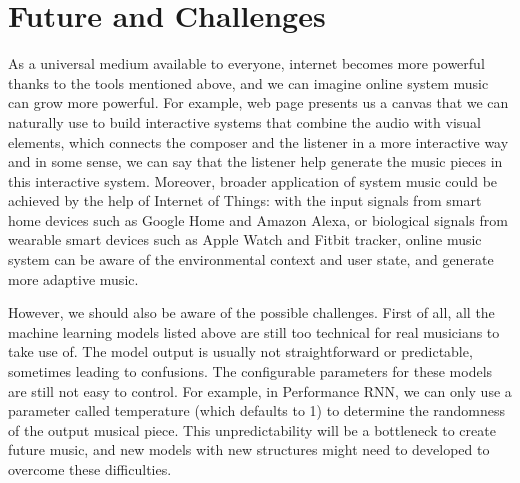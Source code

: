\documentclass[man]{apa6}
\begin{document}
\section{Future and Challenges}
As a universal medium available to everyone, internet becomes more powerful thanks to the tools mentioned above, and we can imagine online system music can grow more powerful. For example, web page presents us a canvas that we can naturally use to build interactive systems that combine the audio with visual elements, which connects the composer and the listener in a more interactive way and in some sense, we can say that the listener help generate the music pieces in this interactive system. Moreover, broader application of system music could be achieved by the help of Internet of Things: with the input signals from smart home devices such as Google Home and Amazon Alexa, or biological signals from wearable smart devices such as Apple Watch and Fitbit tracker, online music system can be aware of the environmental context and user state, and generate more adaptive music.

However, we should also be aware of the possible challenges. First of all, all the machine learning models listed above are still too technical for real musicians to take use of. The model output is usually not straightforward or predictable, sometimes leading to confusions. The configurable parameters for these models are still not easy to control. For example, in Performance RNN, we can only use a parameter called temperature (which defaults to 1) to determine the randomness of the output musical piece. This unpredictability will be a bottleneck to create future music, and new models with new structures might need to developed to overcome these difficulties.

\printbibliography
\end{document}
